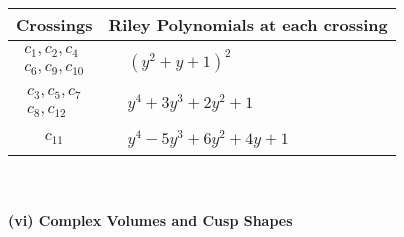 \documentclass[1p]{elsarticle_modified}
\theoremstyle{definition}
\begin{document}
\begin{tabular}{m{50pt}|m{274pt}}
Crossings & \hspace{64pt}Riley Polynomials at each crossing \\
\hline $$\begin{aligned}c_{1},c_{2},c_{4}\\c_{6},c_{9},c_{10}\end{aligned}$$&$\begin{aligned}
&(y^2+y+1)^2
\end{aligned}$\\
\hline $$\begin{aligned}c_{3},c_{5},c_{7}\\c_{8},c_{12}\end{aligned}$$&$\begin{aligned}
&y^4+3 y^3+2 y^2+1
\end{aligned}$\\
\hline $$\begin{aligned}c_{11}\end{aligned}$$&$\begin{aligned}
&y^4-5 y^3+6 y^2+4 y+1
\end{aligned}$\\
\hline
\end{tabular}\\~\\
\newpage\flushleft \textbf{(vi) Complex Volumes and Cusp Shapes}
\end{document}
